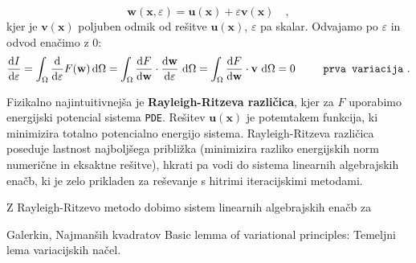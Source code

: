 \setlength{\textheight}{26.5cm}			%
\pagebreak
\setlength{\topmargin}{1.6cm}			%
\setlength{\headheight}{0.0cm}
\setlength{\headsep}{0.0cm}			%
\fancyhf{}
\fancyfoot[C]{\thepage}
\begin{equation}
	\mathbf{w}(\mathbf{x}, \varepsilon) = \mathbf{u}(\mathbf{x}) + \varepsilon \mathbf{v}(\mathbf{x}) \quad ,
\end{equation}
kjer je $\mathbf{v}(\mathbf{x})$ poljuben odmik od rešitve $\mathbf{u}(\mathbf{x})$, $\varepsilon$ pa skalar. Odvajamo po $\varepsilon$ in odvod enačimo z 0:
\begin{equation}
\frac{\mathrm{d} I}{\mathrm{d} \varepsilon} = \int_{\Omega} \frac{\mathrm{d}}{\mathrm{d} \varepsilon} F(\mathbf{w}) \, \mathrm{d} \Omega = \int_{\Omega} \frac{\mathrm{d} F}{\mathrm{d} \mathbf{w}} \cdot \frac{\mathrm{d} \mathbf{w}}{\mathrm{d} \varepsilon} \ \mathrm{d} \Omega = \int_{\Omega} \frac{\mathrm{d} F}{\mathrm{d} \mathbf{w}} \cdot \mathbf{v} \ \mathrm{d} \Omega = 0 \hspace{0.9cm} \texttt{prva variacija} \ .
\end{equation}

Fizikalno najintuitivnejša je \textbf{Rayleigh-Ritzeva različica}, kjer za $F$ uporabimo energijski potencial sistema \texttt{PDE}. Rešitev $\mathbf{u}(\mathbf{x})$ je potemtakem funkcija, ki minimizira totalno potencialno energijo sistema. Rayleigh-Ritzeva različica poseduje lastnost najboljšega približka (minimizira razliko energijskih norm numerične in eksaktne rešitve), hkrati pa vodi do sistema linearnih algebrajskih enačb, ki je zelo prikladen za reševanje s hitrimi iteracijskimi metodami.

Z Rayleigh-Ritzevo metodo dobimo sistem linearnih algebrajskih enačb za 

Galerkin, Najmanših kvadratov \cite{JiangB-LSFEM}
Basic lemma of variational principles: Temeljni lema variacijskih načel.